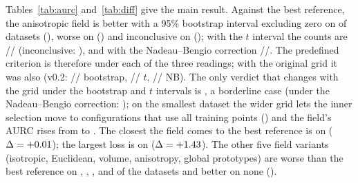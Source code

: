 \documentclass[10pt,a4paper]{article}
\theoremstyle{plain}
\theoremstyle{definition}
\theoremstyle{remark}
\begin{document}
Tables~\ref{tab:aurc} and~\ref{tab:diff} give the main result. Against the best reference, the anisotropic field is better with a 95\% bootstrap interval excluding zero on \CritFanisoBetter{} of \MetaNDatasets{} datasets (\CritFanisoBetterList), worse on \CritFanisoWorse{} (\CritFanisoWorseList) and inconclusive on \CritFanisoIncon{} (\CritFanisoInconList); with the $t$ interval the counts are \CritFanisoBetterT{}/\CritFanisoWorseT{}/\CritFanisoInconT{} (inconclusive: \CritFanisoInconListT), and with the Nadeau--Bengio correction \CritFanisoBetterNB{}/\CritFanisoWorseNB{}/\CritFanisoInconNB. The predefined criterion is therefore \textbf{\CritFanisoMet} under each of the three readings; with the original grid it was also \VTwoCritFanisoMet{} (v0.2: \VTwoCritFanisoBetter{}/\VTwoCritFanisoWorse{}/\VTwoCritFanisoIncon{} bootstrap, \VTwoCritFanisoBetterT{}/\VTwoCritFanisoWorseT{}/\VTwoCritFanisoInconT{} $t$, \VTwoCritFanisoBetterNB{}/\VTwoCritFanisoWorseNB{}/\VTwoCritFanisoInconNB{} NB). The only verdict that changes with the grid under the bootstrap and $t$ intervals is \CritChangedList, a borderline case (under the Nadeau--Bengio correction: \CritChangedListNB); on the smallest dataset the wider grid lets the inner selection move to configurations that use all training points (\SelWine) and the field's AURC rises from \VTwoAurcWineFaniso{} to \AurcWineFaniso. The closest the field comes to the best reference is on \GapClosestDs{} ($\Delta=+0.01$); the largest loss is on \GapWorstDs{} ($\Delta=+1.43$). The other five field variants (isotropic, Euclidean, volume, anisotropy, global prototypes) are worse than the best reference on \CritFisoWorse, \CritFeuclidWorse, \CritFvolWorse, \CritFanisWorse{} and \CritFgprotoWorse{} of the \MetaNDatasets{} datasets and better on none ().
\end{document}
